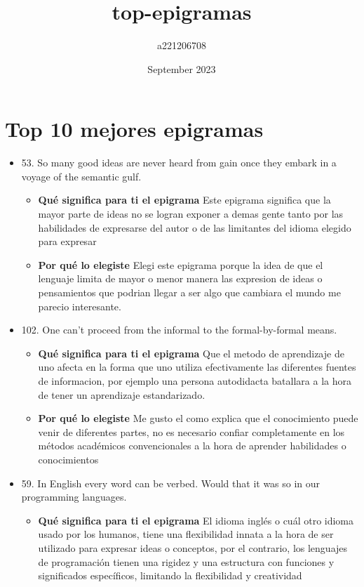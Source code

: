 \documentclass{article}
\title{top-epigramas}
\author{a221206708 }
\date{September 2023}
\begin{document}
\maketitle

\section{Top 10 mejores epigramas}

\begin{itemize}
    \item 53. So many good ideas are never heard from gain once they embark in a voyage of the semantic gulf.
        \begin{itemize}
            \item \textbf{ Qué significa para ti el epigrama} 
                \newline Este epigrama significa que la mayor parte de ideas no se logran exponer a demas gente tanto por las habilidades de expresarse del autor o de las limitantes del idioma elegido para expresar
            \item \textbf{ Por qué lo elegiste}
                \newline Elegi este epigrama porque la idea de que el lenguaje limita de mayor o menor manera las expresion de ideas o pensamientos que podrian llegar a ser algo que cambiara el mundo me parecio interesante.
        \end{itemize}
    \item 102. One can’t proceed from the informal to the formal-by-formal means.
            \begin{itemize}
            \item \textbf{ Qué significa para ti el epigrama} 
            \newline Que el metodo de aprendizaje de uno afecta en la forma que uno utiliza efectivamente las diferentes fuentes de informacion, por ejemplo una persona autodidacta batallara a la hora de tener un aprendizaje estandarizado.
                
            \item \textbf{ Por qué lo elegiste}
            \newline Me gusto el como explica que el conocimiento puede venir de diferentes partes, no es necesario confiar completamente en los métodos académicos convencionales a la hora de aprender habilidades o conocimientos
            
        \end{itemize}
    \item 59. In English every word can be verbed. Would that it was so in our programming languages.
            \begin{itemize}
            \item \textbf{ Qué significa para ti el epigrama} 
            \newline El idioma inglés o cuál otro idioma usado por los humanos, tiene una flexibilidad innata a la hora de ser utilizado para expresar ideas o conceptos, por el contrario, los lenguajes de programación tienen una rigidez y una estructura con funciones y significados específicos, limitando la flexibilidad y creatividad 
                

\end{itemize}
\end{itemize}
\end{document}

